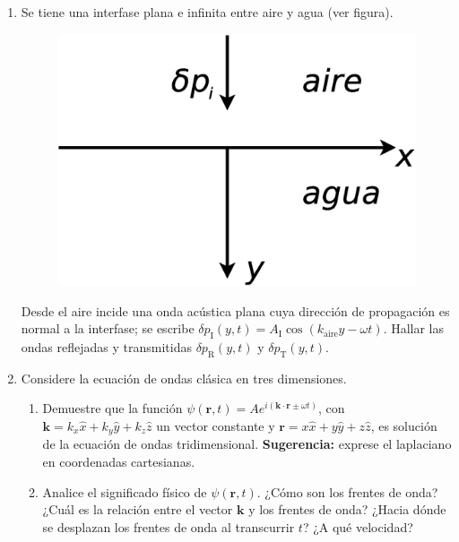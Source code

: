 \documentclass[11pt,spanish]{article}
\begin{document}
\begin{enumerate}

    \item Se tiene una interfase plana e infinita entre aire y agua (ver figura).
    \begin{figure}[H]
        \centering{}\includegraphics[clip,scale=0.25]{figs/ej2-12}
    \end{figure}
    Desde el aire incide una onda acústica plana cuya dirección de propagación
    es normal a la interfase; se escribe
    $\delta p_\text{I}(y,t)=A_\text{I}\cos\left(k_\text{aire}y-\omega t\right)$.
    Hallar las ondas reflejadas y transmitidas $\delta p_\text{R}(y,t)$ y
    $\delta p_\text{T}(y,t)$.


    \item Considere la ecuación de ondas clásica en tres dimensiones.

    \begin{enumerate}
        \item Demuestre que la función
        $\psi(\mathbf{r},t)=Ae^{i(\mathbf{k}\cdot\mathbf{r}\pm\omega t)}$,
        con $\mathbf{k}=k_{x}\hat{x}+k_{y}\hat{y}+k_{z}\hat{z}$ un vector
        constante y $\mathbf{r}=x\hat{x}+y\hat{y}+z\hat{z}$, es solución de la
        ecuación de ondas tridimensional. \textbf{Sugerencia:} exprese el
        laplaciano en coordenadas cartesianas.

        \item Analice el significado físico de $\psi(\mathbf{r},t)$. ¿Cómo son
        los frentes de onda? ¿Cuál es la relación entre el vector $\mathbf{k}$
        y los frentes de onda? ¿Hacia dónde se desplazan los frentes de onda
        al transcurrir $t$? ¿A qué velocidad?


\end{enumerate}
\end{enumerate}
\end{document}
